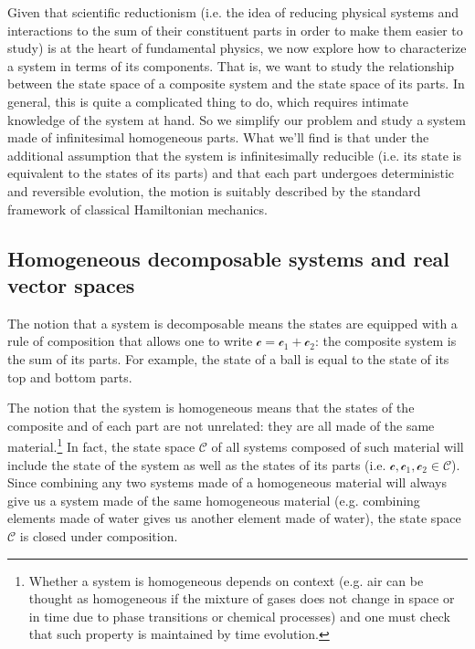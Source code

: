 \documentclass[aps,pra,10pt,twocolumn,floatfix,nofootinbib]{revtex4-1}
\numberwithin{equation}{section}
\theoremstyle{definition}
\begin{document}

Given that scientific reductionism (i.e. the idea of reducing physical systems and interactions to the sum of their constituent parts in order to make them easier to study) is at the heart of fundamental physics, we now explore how to characterize a system in terms of its components. That is, we want to study the relationship between the state space of a composite system and the state space of its parts. In general, this is quite a complicated thing to do, which requires intimate knowledge of the system at hand. So we simplify our problem and study a system made of infinitesimal homogeneous parts. What we'll find is that under the additional assumption that the system is infinitesimally reducible (i.e. its state is equivalent to the states of its parts) and that each part undergoes deterministic and reversible evolution, the motion is suitably described by the standard framework of classical Hamiltonian mechanics.

\subsection{Homogeneous decomposable systems and real vector spaces}
The notion that a system is decomposable means the states are equipped with a rule of composition that allows one to write $\mathcal{c}=\mathcal{c}_1+\mathcal{c}_2$: the composite system is the sum of its parts. For example, the state of a ball is equal to the state of its top and bottom parts.

The notion that the system is homogeneous means that the states of the composite and of each part are not unrelated: they are all made of the same material.\footnote{Whether a system is homogeneous depends on context (e.g. air can be thought as homogeneous if the mixture of gases does not change in space or in time due to phase transitions or chemical processes) and one must check that such property is maintained by time evolution.} In fact, the state space $\mathcal{C}$ of all systems composed of such material will include the state of the system as well as the states of  its parts (i.e. $\mathcal{c}, \mathcal{c}_1, \mathcal{c}_2 \in \mathcal{C}$). Since combining any two systems made of a homogeneous material will always give us a system made of the same homogeneous material (e.g. combining elements made of water gives us another element made of water), the state space $\mathcal{C}$ is closed under composition.
\end{document}
